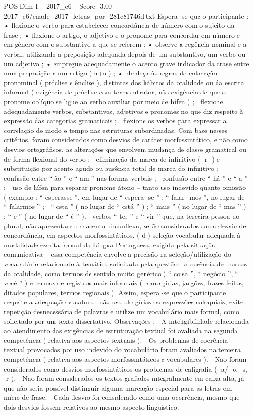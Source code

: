 \begin{textsample}{POS Dim 1 – 2017\_c6 – Score -3.00 – 2017\_c6/enade\_2017\_letras\_por\_281c81746d.txt}
Espera -se que o participante : • flexione o verbo para estabelecer concordância de número com o sujeito da frase ; • flexione o artigo, o adjetivo e o pronome para concordar em número e em gênero com o substantivo a que se referem ; • observe a regência nominal e a verbal, utilizando a preposição adequada depois de um substantivo, um verbo ou um adjetivo ; • empregue adequadamente o acento grave indicador da crase entre uma preposição e um artigo ( a+a ) ; • obedeça às regras de colocação pronominal ( próclise e ênclise ), distintas dos hábitos da oralidade ou da escrita informal ( exigência de próclise com termo atrator, não exigência de que o pronome oblíquo se ligue ao verbo auxiliar por meio de hífen ) ;  flexione adequadamente verbos, substantivos, adjetivos e pronomes no que diz respeito à expressão das categorias gramaticais ;  flexione os verbos para expressar a correlação de modo e tempo nas estruturas subordinadas.
Com base nesses critérios, foram considerados como desvios de caráter morfossintático, e não como desvios ortográficos, as alterações que envolvem mudança de classe gramatical ou de forma flexional do verbo :  eliminação da marca de infinitivo ( -r- ) e substituição por acento agudo ou ausência total de marca do infinitivo ;  confusão entre “ ão ” e “ am ” nas formas verbais ;  confusão entre “ há ” e “ a ” ;  uso de hífen para separar pronome átono – tanto uso indevido quanto omissão ( exemplo : “ esperasse ”, em lugar de “ espera -se ” ; “ falar -mos ”, no lugar de “ falarmos ” ;  “ esta ” ( no lugar de “ está ” ) ; “ mais ” ( no lugar de “ mas ” ) ; “ e ” ( no lugar de “ é ” ).  verbos “ ter ” e “ vir ” que, na terceira pessoa do plural, não apresentarem o acento circunflexo, serão considerados como desvio de concordância, em aspectos morfossintáticos. ( d ) seleção vocabular adequada à modalidade escrita formal da Língua Portuguesa, exigida pela situação comunicativa – essa competência envolve a precisão na seleção/utilização do vocabulário relacionado à temática solicitada pela questão ; a ausência de marcas da oralidade, como termos de sentido muito genérico ( “ coisa ”, “ negócio ”, “ você ” ) e termos de registros mais informais ( como gírias, jargões, frases feitas, ditados populares, termos regionais ).
Assim, espera -se que o participante respeite a adequação vocabular não usando gírias ou expressões coloquiais, evite repetição desnecessária de palavras e utilize um vocabulário mais formal, como solicitado por um texto dissertativo.
Observações : - A inteligibilidade relacionada ao atendimento das exigências de estruturação textual foi avaliada na segunda competência ( relativa aos aspectos textuais ). - Os problemas de coerência textual provocados por uso indevido do vocabulário foram avaliados na terceira competência ( relativa aos aspectos morfossintáticos e vocabulares ). - Não foram considerados como desvios morfossintáticos os problemas de caligrafia ( -a/ -o, -s, -r ). - Não foram considerados os textos grafados integralmente em caixa alta, já que não seria possível distinguir alguma marcação especial para as letras em início de frase. - Cada desvio foi considerado como uma ocorrência, mesmo que dois desvios fossem relativos ao mesmo aspecto linguístico.

\end{textsample}
